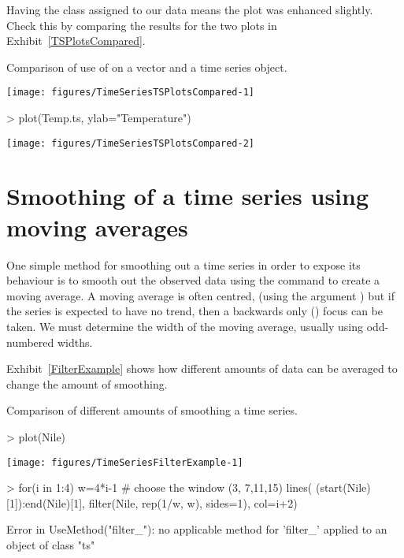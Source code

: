 Having the class assigned to our data means the plot was enhanced slightly. Check this by comparing the results for the two plots in Exhibit~\ref{TSPlotsCompared}. 
\begin{exhibit} 
\begin{center} 
\caption{Comparison of use of  on a vector and a time series object.} 
\label{TSPlotsCompared} 
\begin{Schunk}

\texttt{[image: figures/TimeSeriesTSPlotsCompared-1]} \begin{Sinput}
> plot(Temp.ts, ylab="Temperature") 
\end{Sinput}

\texttt{[image: figures/TimeSeriesTSPlotsCompared-2]} \end{Schunk}
\end{center} 
\end{exhibit} 
 
\section{Smoothing of a time series using moving averages} 
 
One simple method for smoothing out a time series in order to expose its behaviour is to smooth out the observed data using  the  command to create a moving average. 
A moving average is often centred, (using the argument ) but if the series is expected to have no trend, then a backwards only ()  focus can be taken. We must determine the width of the moving average, usually using odd-numbered widths. 
 
Exhibit~\ref{FilterExample} shows how different amounts of data can be averaged to change the amount of smoothing. 
\begin{exhibit} 
\begin{center} 
\caption{Comparison of different amounts of smoothing a time series.} 
\label{FilterExample} 
\begin{Schunk}
\begin{Sinput}
> plot(Nile) 
\end{Sinput}

\texttt{[image: figures/TimeSeriesFilterExample-1]} \begin{Sinput}
> for(i in 1:4){ 
   w=4*i-1 # choose the window (3, 7,11,15) 
   lines( (start(Nile)[1]):end(Nile)[1], filter(Nile, rep(1/w, w), sides=1), col=i+2) 
   } 
\end{Sinput}
\begin{Soutput}
Error in UseMethod("filter_"): no applicable method for 'filter_' applied to an object of class "ts"
\end{Soutput}
\end{Schunk}
\end{center} 
\end{exhibit} 
 
